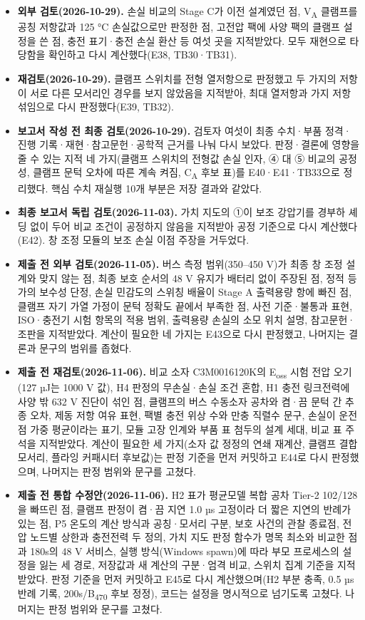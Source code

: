 \begin{itemize}
\item \textbf{외부 검토(2026-10-29).} 손실 비교의 Stage C가 이전 설계였던 점, V\textsubscript{A} 클램프를 공칭 저항값과 125 °C 손실값으로만 판정한 점, 고전압 팩에 사양 팩의 클램프 설정을 쓴 점, 충전 표기·충전 손실 환산 등 여섯 곳을 지적받았다. 모두 재현으로 타당함을 확인하고 다시 계산했다(E38, TB30·TB31).
\item \textbf{재검토(2026-10-29).} 클램프 스위치를 전형 열저항으로 판정했고 두 가지의 저항이 서로 다른 모서리인 경우를 보지 않았음을 지적받아, 최대 열저항과 가지 저항 섞임으로 다시 판정했다(E39, TB32).
\item \textbf{보고서 작성 전 최종 검토(2026-10-29).} 검토자 여섯이 최종 수치·부품 정격·진행 기록·재현·참고문헌·공학적 근거를 나눠 다시 보았다. 판정·결론에 영향을 줄 수 있는 지적 네 가지(클램프 스위치의 전형값 손실 인자, ④ 대 ⑤ 비교의 공정성, 클램프 문턱 오차에 따른 계속 켜짐, C\textsubscript{A} 후보 표)를 E40·E41·TB33으로 정리했다. 핵심 수치 재실행 10개 부분은 저장 결과와 같았다.
\item \textbf{최종 보고서 독립 검토(2026-11-03).} 가치 지도의 ①이 보조 강압기를 경부하 셰딩 없이 두어 비교 조건이 공정하지 않음을 지적받아 공정 기준으로 다시 계산했다(E42). 창 조정 모듈의 보조 손실 이점 주장을 거두었다.
\item \textbf{제출 전 외부 검토(2026-11-05).} 버스 측정 범위(350–450 V)가 최종 창 조정 설계와 맞지 않는 점, 최종 보호 순서의 48 V 유지가 배터리 없이 주장된 점, 정적 등가의 보수성 단정, 손실 민감도의 스위칭 배율이 Stage A 출력용량 항에 빠진 점, 클램프 자기 가열 가정이 문턱 정확도 끝에서 부족한 점, 사전 기준·불통과 표현, ISO·충전기 시험 항목의 적용 범위, 출력용량 손실의 소모 위치 설명, 참고문헌·조판을 지적받았다. 계산이 필요한 네 가지는 E43으로 다시 판정했고, 나머지는 결론과 문구의 범위를 좁혔다.
\item \textbf{제출 전 재검토(2026-11-06).} 비교 소자 C3M0016120K의 E\textsubscript{oss} 시험 전압 오기(127 µJ는 1000 V 값), H4 판정의 무손실·손실 조건 혼합, H1 충전 링크전력에 사양 밖 632 V 진단이 섞인 점, 클램프의 버스 수동소자 공차와 켬·끔 문턱 간 추종 오차, 제동 저항 여유 표현, 팩별 충전 위상 수와 만충 직렬수 문구, 손실이 운전점 가중 평균이라는 표기, 모듈 고장 인계와 부품 표 첨두의 설계 세대, 비교 표 주석을 지적받았다. 계산이 필요한 세 가지(소자 값 정정의 연쇄 재계산, 클램프 결합 모서리, 플라잉 커패시터 후보값)는 판정 기준을 먼저 커밋하고 E44로 다시 판정했으며, 나머지는 판정 범위와 문구를 고쳤다.
\item \textbf{제출 전 통합 수정안(2026-11-06).} H2 표가 평균모델 복합 공차 Tier-2 102/128을 빠뜨린 점, 클램프 판정이 켬·끔 지연 1.0 µs 고정이라 더 짧은 지연의 반례가 있는 점, P5 온도의 계산 방식과 공칭·모서리 구분, 보호 사건의 관찰 종료점, 전압 노드별 상한과 충전전력 두 정의, 가치 지도 판정 함수가 명목 최소와 비교한 점과 180s의 48 V 서비스, 실행 방식(Windows spawn)에 따라 부모 프로세스의 설정을 잃는 세 경로, 저장값과 새 계산의 구분·엄격 비교, 스위치 집계 기준을 지적받았다. 판정 기준을 먼저 커밋하고 E45로 다시 계산했으며(H2 부분 충족, 0.5 µs 반례 기록, 200s/B\textsubscript{470} 후보 정정), 코드는 설정을 명시적으로 넘기도록 고쳤다. 나머지는 판정 범위와 문구를 고쳤다.

\end{itemize}
